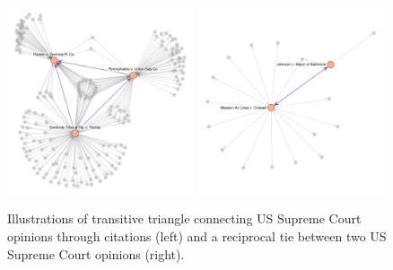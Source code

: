 \documentclass[headsepline=true, abstracton]{scrartcl}
\begin{document}
\begin{figure}[bt]
	\centering
	\includegraphics[width = 0.49\textwidth,trim= 2cm 2cm 3cm 2cm,clip=true ]{citations_trans.pdf}\hspace{0.2cm}%
	\includegraphics[width = 0.49\textwidth,trim= 2cm 2cm 3cm 2cm,clip=true ]{citations_recip.pdf}
	\caption{Illustrations of transitive triangle connecting US Supreme Court opinions through citations (left) and a reciprocal tie between two US Supreme Court opinions (right).}
	\label{fig:transitivity}
\end{figure}
\end{document}
